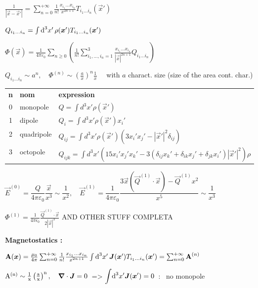 \item $\frac{1}{|\vec{x} - \vec{x}'|} = \sum_{n=0}^{+\infty} \frac{1}{n!} \frac{x_{i_1}...x_{i_n}}{x^{2n+1}} T_{i_1...i_n}(\vec{x}')$

\item $Q_{i_1...i_n} = \int \ud ^3x' \, \rho(\vec{x}') T_{i_1...i_n}(\vec{x}')$

\item $ \Phi(\vec{x}) = \frac{1}{4\pi\varepsilon_0}\sum_{n\geq0}\left(\frac{1}{n!}\sum_{i_1,...,i_n = 1}^{3}\frac{x_{i_1}...x_{i_n}}{|\vec{x}|^{2n+1}}Q_{i_1...i_n}\right)$

\item $Q_{i_1...i_n} \sim a^n , \quad \Phi^{(n)} \sim \left(\frac{a}{x}\right)^n \frac{1}{x} \quad$ with $a$ charact. size (size of the area cont. char.)

\item \begin{tabular}{c | l l}
	\textbf{n} & \textbf{nom} & \textbf{expression} \\
	0 & monopole & $Q = \int d^3x' \rho (\vec{x}')$ \\
	1 & dipole & $Q_i = \int d^3x' \rho (\vec{x}') x_i'$ \\
	2 & quadripole & $Q_{ij} = \int d^3x' \rho (\vec{x}') (3x_i'x_j' - |\vec{x}'|^2\delta_{ij})$ \\
	3 & octopole & $Q_{ijk} = \int d^3x' (15x_i'x_j'x_k' -3(\delta_{ij}x_k' + \delta_{ik}x_j'+\delta_{jk}x_i') |\vec{x}'|^2)\rho$
\end{tabular}

\item $\vec{E}^{(0)} = \dfrac{Q}{4\pi\varepsilon_0} \dfrac{\vec{x}}{x^3} \sim \dfrac{1}{x^2} ,\quad \vec{E}^{(1)} = \dfrac{1}{4\pi\varepsilon_0}\dfrac{3\vec{x}(\vec{Q}^{(1)}\cdot\vec{x}) - \vec{Q}^{(1)}x^2}{x^5} \sim \dfrac{1}{x^3}$
\item $\Phi^{(1)} = \frac{1}{4\pi \epsilon_0}\frac{\vec{Q}^{(1)}\cdot \vec{x}}{2 |\vec{x}|^3}$ AND OTHER STUFF COMPLETA

\item \textbf{Magnetostatics :}

\item $\vec{\rm{A}}(\vec{x}) = \frac{\mu_0}{4\pi} \sum_{n=0}^{+\infty} \frac{1}{n!} \frac{x_{i_1}...x_{i_n}}{x^{2n+1}} \int \ud ^3x' \, \vec{J}(\vec{x}') T_{i_1...i_n}(\vec{x}') = \sum_{n=0}^{+\infty} \vec{\rm{A}}^{(n)}$

\item $\rm{A}^{(n)} \sim \frac{1}{x} \left( \frac{a}{x} \right)^n, \quad \vec{\nabla}\cdot\vec{J} = 0 \, $ => $ \displaystyle{\int} \ud ^3x' \vec{J}(\vec{x}') = 0 \,$ : \, no monopole

